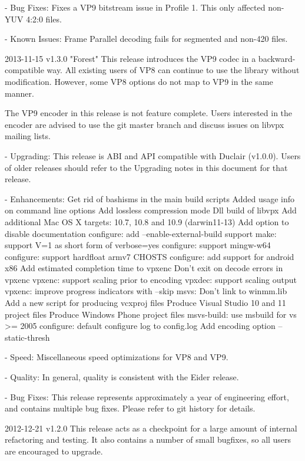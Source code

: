 \begin{DoxyVerbInclude}
  - Bug Fixes:
    Fixes a VP9 bitstream issue in Profile 1. This only affected non-YUV 4:2:0
    files.

  - Known Issues:
    Frame Parallel decoding fails for segmented and non-420 files.

2013-11-15 v1.3.0 "Forest"
  This release introduces the VP9 codec in a backward-compatible way.
  All existing users of VP8 can continue to use the library without
  modification. However, some VP8 options do not map to VP9 in the same manner.

  The VP9 encoder in this release is not feature complete. Users interested in
  the encoder are advised to use the git master branch and discuss issues on
  libvpx mailing lists.

  - Upgrading:
    This release is ABI and API compatible with Duclair (v1.0.0). Users
    of older releases should refer to the Upgrading notes in this document
    for that release.

  - Enhancements:
      Get rid of bashisms in the main build scripts
      Added usage info on command line options
      Add lossless compression mode
      Dll build of libvpx
      Add additional Mac OS X targets: 10.7, 10.8 and 10.9 (darwin11-13)
      Add option to disable documentation
      configure: add --enable-external-build support
      make: support V=1 as short form of verbose=yes
      configure: support mingw-w64
      configure: support hardfloat armv7 CHOSTS
      configure: add support for android x86
      Add estimated completion time to vpxenc
      Don't exit on decode errors in vpxenc
      vpxenc: support scaling prior to encoding
      vpxdec: support scaling output
      vpxenc: improve progress indicators with --skip
      msvs: Don't link to winmm.lib
      Add a new script for producing vcxproj files
      Produce Visual Studio 10 and 11 project files
      Produce Windows Phone project files
      msvs-build: use msbuild for vs >= 2005
      configure: default configure log to config.log
      Add encoding option --static-thresh

  - Speed:
      Miscellaneous speed optimizations for VP8 and VP9.

  - Quality:
      In general, quality is consistent with the Eider release.

  - Bug Fixes:
      This release represents approximately a year of engineering effort,
      and contains multiple bug fixes. Please refer to git history for details.


2012-12-21 v1.2.0
  This release acts as a checkpoint for a large amount of internal refactoring
  and testing. It also contains a number of small bugfixes, so all users are
  encouraged to upgrade.


\end{DoxyVerbInclude}
